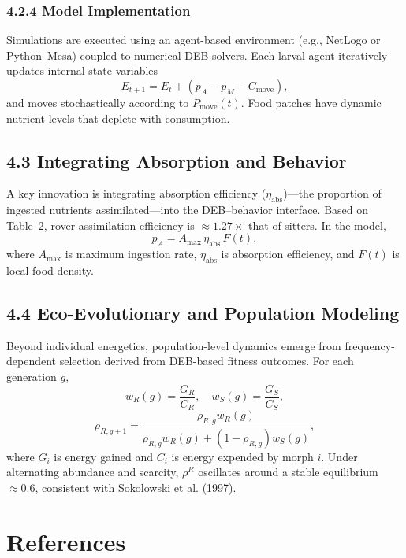 \documentclass[11pt]{article}
\begin{document}
\subsubsection*{4.2.4 Model Implementation}

Simulations are executed using an agent-based environment (e.g., NetLogo or Python--Mesa) coupled to numerical DEB solvers. Each larval agent iteratively updates internal state variables
\begin{equation}
E_{t+1} = E_t + (p_A - p_M - C_{\text{move}}),
\end{equation}
and moves stochastically according to $P_{\text{move}}(t)$. Food patches have dynamic nutrient levels that deplete with consumption.

\subsection*{4.3 Integrating Absorption and Behavior}

A key innovation is integrating absorption efficiency ($\eta_{\text{abs}}$)---the proportion of ingested nutrients assimilated---into the DEB--behavior interface. Based on Table~2, rover assimilation efficiency is $\approx 1.27 \times$ that of sitters. In the model,
\begin{equation}
p_A = A_{\max} \, \eta_{\text{abs}} \, F(t),
\end{equation}
where $A_{\max}$ is maximum ingestion rate, $\eta_{\text{abs}}$ is absorption efficiency, and $F(t)$ is local food density.

\subsection*{4.4 Eco-Evolutionary and Population Modeling}

Beyond individual energetics, population-level dynamics emerge from frequency-dependent selection derived from DEB-based fitness outcomes. For each generation $g$,
\begin{equation}
w_R(g) = \frac{G_R}{C_R}, \quad w_S(g) = \frac{G_S}{C_S},
\end{equation}
\begin{equation}
\rho_{R,g+1} = \frac{\rho_{R,g} w_R(g)}{\rho_{R,g} w_R(g) + (1 - \rho_{R,g}) w_S(g)},
\end{equation}
where $G_i$ is energy gained and $C_i$ is energy expended by morph $i$. Under alternating abundance and scarcity, $\rho^R$ oscillates around a stable equilibrium $\approx 0.6$, consistent with Sokolowski et al. (1997).

\section*{References}

\nocite{Ahmad2018,Allen2017,BenShahar2002,Colombani2003,Fujiwara2002,Kaun2007,Kaun2008,KaunSokolowski2009,Kent2009,Kooijman2010,LeePark2004,Osborne1997,Sokolowski1997,Wosniack2022}



\end{document}
